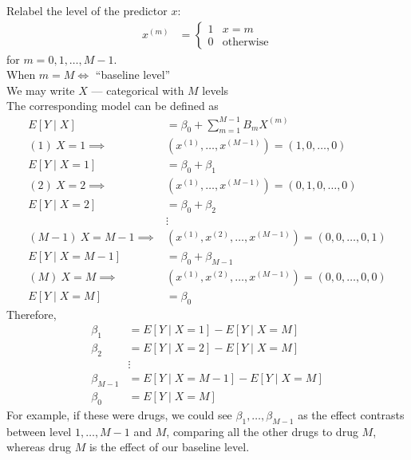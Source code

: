 \documentclass[12 pt]{article}
\begin{document}
  Relabel the level of the predictor $x$:
  \begin{align*}
    x^{(m)} & =
              \begin{cases}
                1 & x = m
                \\ 0 & \text{otherwise}
              \end{cases}
  \end{align*}
  for $m = 0, 1, \ldots, M-1$.
  \\ When $m=M \iff$ ``baseline level''
  \\ We may write $X$ --- categorical with $M$ levels
  \\ The corresponding model can be defined as
  \begin{align*}
    E[Y \mid X] & = \beta_0 + \sum_{m = 1}^{M-1}B_{m}X^{(m)}
    \\(1)\ X = 1 \implies & (x^{(1)}, \ldots, x^{(M-1)}) = (1,0,\ldots,0)
    \\ E[Y \mid X = 1] & = \beta_0 + \beta_1
    \\(2)\ X = 2 \implies & (x^{(1)}, \ldots, x^{(M-1)}) =
                            (0,1,0,\ldots,0)
    \\ E[Y \mid X = 2] & = \beta_0 + \beta_2
    \\ &\vdots
    \\ (M-1)\ X = M-1 \implies& (x^{(1)}, x^{(2)}, \ldots, x^{(M-1)}) =
    (0,0, \ldots, 0, 1)
    \\ E[Y \mid X = M-1] & = \beta_0 + \beta_{M-1}
    \\ (M)\ X = M \implies &(x^{(1)}, x^{(2)}, \ldots, x^{(M-1)}) =
    (0,0, \ldots, 0, 0)
    \\ E[Y \mid X = M] & = \beta_0
  \end{align*}
  Therefore,
  \begin{align*}
    \beta_1 & = E[Y \mid X = 1] - E[Y \mid X = M]
    \\ \beta_2 & = E[Y \mid X = 2] - E[Y \mid X = M]
    \\ &\vdots
    \\ \beta_{M-1} & = E[Y \mid X = M-1] - E[Y \mid X = M]
    \\ \beta_0 & = E[Y \mid X = M]
  \end{align*}
  For example, if these were drugs, we could see $\beta_1, \ldots,
  \beta_{M-1}$ as the effect contrasts between level $1,\ldots, M-1$
  and $M$, comparing all the other drugs to drug
  $M$, whereas drug $M$ is the effect of our baseline level.
\end{document}

